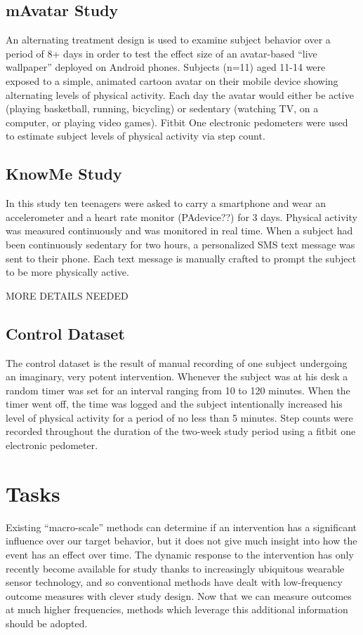 \documentclass[review,journal]{vgtc}         %
\begin{document}
\subsection{mAvatar Study}
An alternating treatment design is used to examine subject behavior over a period of 8+ days in order to test the effect size of an avatar-based “live wallpaper” deployed on Android phones.
Subjects (n=11) aged 11-14 were exposed to a simple, animated cartoon avatar on their mobile device showing alternating levels of physical activity.
Each day the avatar would either be active (playing basketball, running, bicycling) or sedentary (watching TV, on a computer, or playing video games).
Fitbit One electronic pedometers were used to estimate subject levels of physical activity via step count.

\subsection{KnowMe Study}
In this study ten teenagers were asked to carry a smartphone and wear an accelerometer and a heart rate monitor (PAdevice??) for 3 days.
Physical activity was measured continuously and was monitored in real time.
When a subject had been continuously sedentary for two hours, a personalized SMS text message was sent to their phone.
Each text message is manually crafted to prompt the subject to be more physically active.

MORE DETAILS NEEDED

\subsection{Control Dataset}
The control dataset is the result of manual recording of one subject undergoing an imaginary, very potent intervention.
Whenever the subject was at his desk a random timer was set for an interval ranging from 10 to 120 minutes.
When the timer went off, the time was logged and the subject intentionally increased his level of physical activity for a period of no less than 5 minutes.
Step counts were recorded throughout the duration of the two-week study period using a fitbit one electronic pedometer.

\section{Tasks}
Existing “macro-scale” methods can determine if an intervention has a significant influence over our target behavior, but it does not give much insight into how the event has an effect over time.
The dynamic response to the intervention has only recently become available for study thanks to increasingly ubiquitous wearable sensor technology, and so conventional methods have dealt with low-frequency outcome measures with clever study design.
Now that we can measure outcomes at much higher frequencies, methods which leverage this additional information should be adopted.
\end{document}
